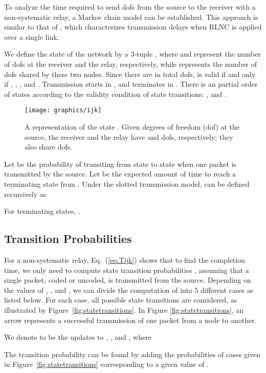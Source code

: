 To analyze the time required to send  dofs from the source to the receiver with a non-systematic relay, a Markov chain model can be established. This approach is similar to that of \cite{lucani_fieldsize}, which characterizes transmission delays when RLNC is applied over a single link.

We define the state of the network by a 3-tuple , where  and  represent the number of dofs at the receiver and the relay, respectively, while  represents the number of dofs shared by these two nodes. Since there are in total  dofs,  is valid if and only if , , , and . Transmission starts in , and terminates in . There is an partial order of states  according to the validity condition of state transitions: ,  and .

\begin{figure}[t!]
\centering
\texttt{[image: graphics/ijk]}
\caption{A representation of the state . Given  degrees of freedom (dof) at the source, the receiver and the relay have  and  dofs, respectively; they also share  dofs.}\vspace*{-.3cm}
\label{fig:state}
\end{figure}

Let  be the probability of transiting from state  to state  when one packet is transmitted by the source. Let  be the expected amount of time to reach a terminating state from . Under the slotted transmission model,  can be defined recursively as

For terminating states, .


\subsection{Transition Probabilities}

For a non-systematic relay, Eq.~(\ref{eq:Tijk}) shows that to find the completion time, we only need to compute state transition probabilities , assuming that a single packet, coded or uncoded, is transmitted from the source. Depending on the values of , , and , we can divide the computation of  into 5 different cases as listed below. For each case, all possible state transitions are considered, as illustrated by Figure~\ref{fig:statetransitions}. In Figure \ref{fig:statetransitions}, an arrow represents a successful transmission of one packet from a node to another. 

We denote  to be the updates to , , and , where

 The transition probability  can be found by adding the probabilities of cases given in Figure~\ref{fig:statetransitions} corresponding to a given value of .

